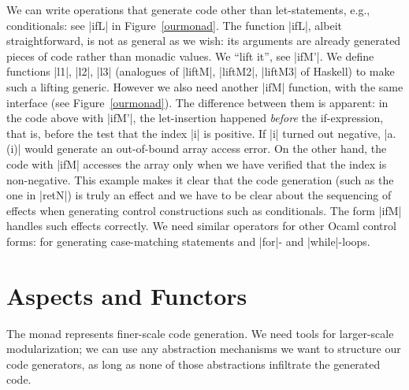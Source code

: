 \documentclass{llncs}
\begin{document}
We can write operations that generate code other than let-statements,
e.g., conditionals: see |ifL| in Figure~\ref{ourmonad}. The function |ifL|, 
albeit straightforward, is not as general as we wish: its arguments are
already generated pieces of code rather than monadic values. We
``lift it'', see |ifM'|. We define functions |l1|,
|l2|, |l3| (analogues of |liftM|, |liftM2|, |liftM3| of Haskell) 
to make such a lifting generic. However we also need
another |ifM| function, with the same
interface (see Figure~\ref{ourmonad}). The difference between them is
apparent: in the code above with |ifM'|, the let-insertion
happened \emph{before} the if-expression, that is, before the test that
the index |i| is positive. If |i| turned out
negative, |a.(i)| would generate an out-of-bound array access
error. On the other hand, the code with |ifM| accesses the array only
when we have verified that the index is non-negative. This example
makes it clear that the code generation (such as the one in |retN|) is 
truly an effect and we have to be clear about the sequencing of
effects when generating control constructions such as conditionals.
The form |ifM| handles such effects correctly. We
need similar operators for other Ocaml control forms: for generating
case-matching statements and |for|- and |while|-loops.

\section{Aspects and Functors}\label{functors}

The monad represents finer-scale code generation. We need tools for
larger-scale modularization; we can use any abstraction
mechanisms we want to structure our code generators, as long as none
of those abstractions infiltrate the generated code.
\end{document}
